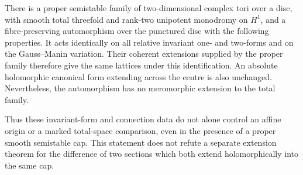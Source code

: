 \begin{proposition}\label{push:src:B.4.29}
\label{push:B429}
There is a proper semistable family of two-dimensional
complex tori over a disc, with smooth total threefold
and rank-two unipotent monodromy on $H^1$, and a
fibre-preserving automorphism over the punctured disc
with the following properties. It acts identically
on all relative invariant one- and two-forms and
on the Gauss--Manin variation. Their coherent
extensions supplied by the proper family therefore
give the same lattices under this identification.
An absolute holomorphic canonical form extending
across the centre is also unchanged. Nevertheless,
the automorphism has no meromorphic extension to
the total family.

Thus these invariant-form and connection data do
not alone control an affine origin or a marked
total-space comparison, even in the presence of
a proper smooth semistable cap. This statement
does not refute a separate extension theorem
for the difference of two sections which both
extend holomorphically into the same cap.
\end{proposition}

